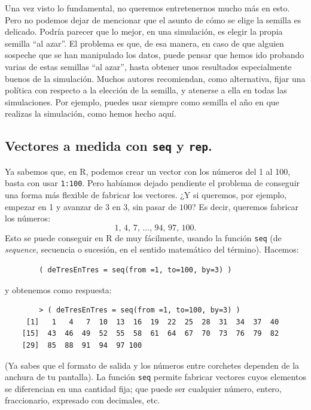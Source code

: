 \documentclass[10pt,a4paper]{article}\usepackage[]{graphicx}\usepackage[]{color}
\begin{document}
Una vez visto lo fundamental, no queremos entretenernos mucho más en esto. Pero no podemos dejar de mencionar que el asunto de cómo se elige la semilla es delicado. Podría parecer que lo mejor, en una simulación, es elegir la propia semilla ``al azar''. El problema es que, de esa manera, en caso de que alguien sospeche que se han manipulado los datos, puede pensar que hemos ido probando varias de estas semillas ``al azar'', hasta obtener unos resultados especialmente buenos de la simulación. Muchos autores recomiendan, como alternativa, fijar una política con respecto a la elección de la semilla, y atenerse a ella en todas las simulaciones. Por ejemplo, puedes usar siempre como semilla el año en que realizas la simulación, como hemos hecho aquí.



\subsection{Vectores a medida con {\tt seq} y {\tt rep}.}
\label{tut02:subsec:VectoresMedidaSeqRep}

Ya sabemos que, en R, podemos crear un vector con los números del 1 al 100, basta con usar {\tt 1:100}. Pero habíamos dejado pendiente el problema de conseguir una forma más flexible de fabricar los vectores. ¿Y si queremos, por ejemplo, empezar en 1 y avanzar de 3 en 3, sin pasar de $100$? Es decir, queremos fabricar los números:
\[1,\, 4,\, 7,\,\ldots,\, 94,\, 97,\, 100.\]
Esto se puede conseguir en R de muy fácilmente, usando la función {\tt seq} (de {\em sequence}, secuencia o sucesión, en el sentido matemático del término). Hacemos:
    \begin{verbatim}
        ( deTresEnTres = seq(from =1, to=100, by=3) )
    \end{verbatim}
y obtenemos como respuesta:
    \begin{verbatim}
        > ( deTresEnTres = seq(from =1, to=100, by=3) )
     [1]   1   4   7  10  13  16  19  22  25  28  31  34  37  40
    [15]  43  46  49  52  55  58  61  64  67  70  73  76  79  82
    [29]  85  88  91  94  97 100
    \end{verbatim}
(Ya sabes que el formato de salida y los números entre corchetes dependen de la anchura de tu pantalla). La función {\tt seq} permite fabricar vectores cuyos elementos se diferencian en una cantidad fija; que puede ser cualquier número, entero, fraccionario, expresado con decimales, etc.\\
\end{document}
